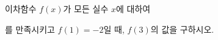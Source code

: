 이차함수 $f(x)$가 모든 실수 $x$에 대하여\par\smallskip{}\par\smallskip\noindent 를 만족시키고 $f(1)=-2$일 때, $f(3)$의 값을 구하시오.
